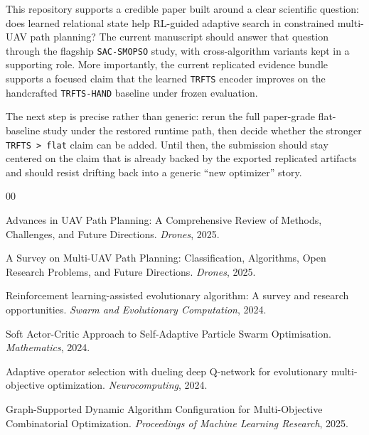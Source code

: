 \documentclass[a4paper,fleqn]{cas-sc}
\begin{document}
This repository supports a credible paper built around a clear scientific question: does learned relational state help RL-guided adaptive search in constrained multi-UAV path planning? The current manuscript should answer that question through the flagship \texttt{SAC-SMOPSO} study, with cross-algorithm variants kept in a supporting role. More importantly, the current replicated evidence bundle supports a focused claim that the learned \texttt{TRFTS} encoder improves on the handcrafted \texttt{TRFTS-HAND} baseline under frozen evaluation.

The next step is precise rather than generic: rerun the full paper-grade flat-baseline study under the restored runtime path, then decide whether the stronger \texttt{TRFTS > flat} claim can be added. Until then, the submission should stay centered on the claim that is already backed by the exported replicated artifacts and should resist drifting back into a generic ``new optimizer'' story.

\begin{thebibliography}{00}

Advances in UAV Path Planning: A Comprehensive Review of Methods, Challenges, and Future Directions.
\textit{Drones}, 2025.

A Survey on Multi-UAV Path Planning: Classification, Algorithms, Open Research Problems, and Future Directions.
\textit{Drones}, 2025.

Reinforcement learning-assisted evolutionary algorithm: A survey and research opportunities.
\textit{Swarm and Evolutionary Computation}, 2024.

Soft Actor-Critic Approach to Self-Adaptive Particle Swarm Optimisation.
\textit{Mathematics}, 2024.

Adaptive operator selection with dueling deep Q-network for evolutionary multi-objective optimization.
\textit{Neurocomputing}, 2024.

Graph-Supported Dynamic Algorithm Configuration for Multi-Objective Combinatorial Optimization.
\textit{Proceedings of Machine Learning Research}, 2025.

\end{thebibliography}
\end{document}
